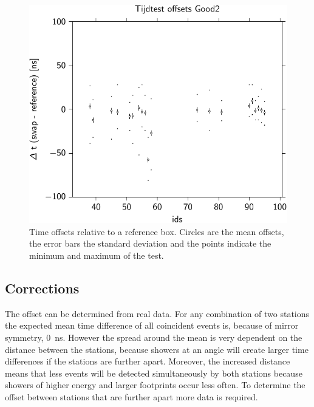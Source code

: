 \begin{figure}
    \centering
    \includegraphics{plots/calibration/hisparc_offsets}
    \caption{Time offsets relative to a reference box. Circles are the
             mean offsets, the error bars the standard deviation and the
             points indicate the minimum and maximum of the test.}
    \label{fig:hisparc_offsets}
\end{figure}


\subsection{Corrections}

The offset can be determined from real data. For any combination of two
stations the expected mean time difference of all coincident events is,
because of mirror symmetry, \SI{0}{\nano\second}. However the spread
around the mean is very dependent on the distance between the stations,
because showers at an angle will create larger time differences if the
stations are further apart. Moreover, the increased distance means that
less events will be detected simultaneously by both stations because
showers of higher energy and larger footprints occur less often. To
determine the offset between stations that are further apart more data
is required.
